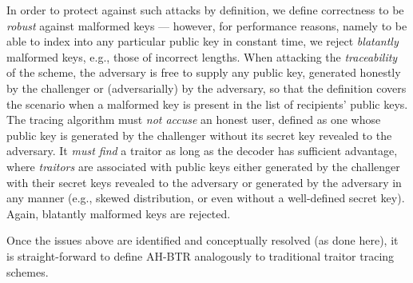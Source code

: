 In order to protect against such attacks by definition,
we define correctness to be \emph{robust} against malformed keys ---
however, for performance reasons, namely to be able to index into any particular public key in constant time,
we reject \emph{blatantly} malformed keys, e.g., those of incorrect lengths.
When attacking the \emph{traceability} of the scheme, the adversary is free to supply any public key, generated honestly by the challenger or (adversarially) by the adversary, so that the definition covers the scenario when a malformed key is present in the list of recipients' public keys.
The tracing algorithm must \emph{not accuse} an honest user, defined as one whose public key is generated by the challenger without its secret key revealed to the adversary.
It \emph{must find} a traitor as long as the decoder has sufficient advantage, where \emph{traitors} are associated with public keys either generated by the challenger with their secret keys revealed to the adversary or generated by the adversary in any manner (e.g., skewed distribution, or even without a well-defined secret key).
Again, blatantly malformed keys are rejected.

Once the issues above are identified and conceptually resolved (as done here),
it is straight-forward to define AH-BTR analogously to traditional traitor tracing schemes.
